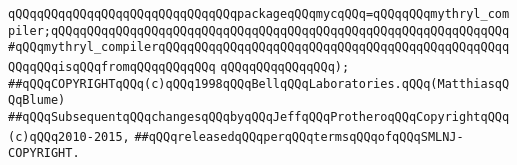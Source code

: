 \verb|qQQqqQQqqQQqqQQqqQQqqQQqqQQqqQQqpackageqQQqmycqQQq=qQQqqQQqmythryl_compiler;qQQqqQQqqQQqqQQqqQQqqQQqqQQqqQQqqQQqqQQqqQQqqQQqqQQqqQQqqQQqqQQq#qQQqmythryl_compilerqQQqqQQqqQQqqQQqqQQqqQQqqQQqqQQqqQQqqQQqqQQqqQQqqQQqqQQqisqQQqfromqQQqqQQqqQQq|\newline
\verb|qQQqqQQqqQQqqQQq);|\newline
\newline
\newline
\verb|##qQQqCOPYRIGHTqQQq(c)qQQq1998qQQqBellqQQqLaboratories.qQQq(MatthiasqQQqBlume)|\newline
\verb|##qQQqSubsequentqQQqchangesqQQqbyqQQqJeffqQQqProtheroqQQqCopyrightqQQq(c)qQQq2010-2015,|\newline
\verb|##qQQqreleasedqQQqperqQQqtermsqQQqofqQQqSMLNJ-COPYRIGHT.|\newline

